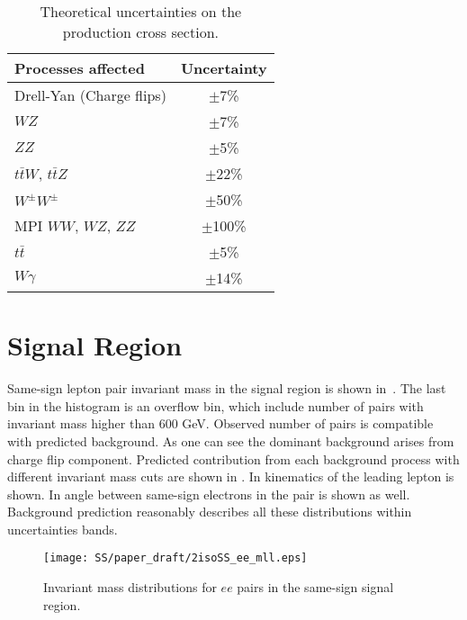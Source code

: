 \begin{table}[ht]
\caption{Theoretical uncertainties on the production cross section.}
\begin{center}
\begin{tabular}{l|c}
Processes affected & Uncertainty \\
\hline
 Drell-Yan (Charge flips) & $\pm$7\% \\
 $WZ$ & $\pm$7\% \\
 $ZZ$ & $\pm$5\% \\
 $t\bar{t}W$, $t\bar{t}Z$  & $\pm$22\% \\
 $W^{\pm}W^{\pm}$ & $\pm$50\% \\
 MPI $WW$, $WZ$, $ZZ$ & $\pm$100\% \\
 $t\bar{t}$ & $\pm$5\% \\
 $W\gamma$ & $\pm$14\% \\
\end{tabular}
\end{center}
\label{tab:systematics_common}
\end{table}



\section{Signal Region}
\label{sec:ss_signalRegion}

Same-sign lepton pair invariant mass in the signal region is shown in~.
The last bin in the histogram is an overflow bin, which include number of pairs with invariant mass higher than 600 GeV.
Observed number of pairs is compatible with predicted background.
As one can see the dominant background arises from charge flip component.
Predicted contribution from each background process with different invariant mass cuts are shown in .
In  kinematics of the leading lepton is shown. 
In  angle between same-sign electrons in the pair is shown as well.
Background prediction reasonably describes all these distributions within uncertainties bands.


\begin{figure}[h]
\begin{center}
\texttt{[image: SS/paper\_draft/2isoSS\_ee\_mll.eps]}
\caption{\toDo Invariant mass distributions for $ee$ pairs in the same-sign signal region.}
\label{fig:signal_mass}
\end{center}
\end{figure}


